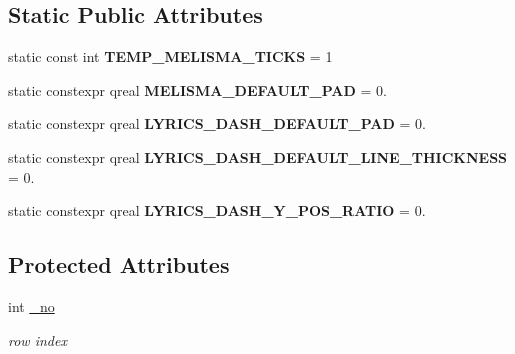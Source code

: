 \subsection*{Static Public Attributes}
\begin{DoxyCompactItemize}
\item 
\mbox{\label{class_ms_1_1_lyrics_a4686fb037dfd8ab5e6dfcf9dc6902965}} 
static const int {\bfseries T\+E\+M\+P\+\_\+\+M\+E\+L\+I\+S\+M\+A\+\_\+\+T\+I\+C\+KS} = 1
\item 
\mbox{\label{class_ms_1_1_lyrics_a29c12cf031ba4bdc50051e2d1e749e4a}} 
static constexpr qreal {\bfseries M\+E\+L\+I\+S\+M\+A\+\_\+\+D\+E\+F\+A\+U\+L\+T\+\_\+\+P\+AD} = 0.
\item 
\mbox{\label{class_ms_1_1_lyrics_a43d39f9157e3ca559b94ad166d7795d1}} 
static constexpr qreal {\bfseries L\+Y\+R\+I\+C\+S\+\_\+\+D\+A\+S\+H\+\_\+\+D\+E\+F\+A\+U\+L\+T\+\_\+\+P\+AD} = 0.
\item 
\mbox{\label{class_ms_1_1_lyrics_a31f0fbd72454ebadb6404fb7194a0380}} 
static constexpr qreal {\bfseries L\+Y\+R\+I\+C\+S\+\_\+\+D\+A\+S\+H\+\_\+\+D\+E\+F\+A\+U\+L\+T\+\_\+\+L\+I\+N\+E\+\_\+\+T\+H\+I\+C\+K\+N\+E\+SS} = 0.
\item 
\mbox{\label{class_ms_1_1_lyrics_a88b203c6638cc8e69ad87a8a89a4882f}} 
static constexpr qreal {\bfseries L\+Y\+R\+I\+C\+S\+\_\+\+D\+A\+S\+H\+\_\+\+Y\+\_\+\+P\+O\+S\+\_\+\+R\+A\+T\+IO} = 0.
\end{DoxyCompactItemize}
\subsection*{Protected Attributes}
\begin{DoxyCompactItemize}
\item 
\mbox{\label{class_ms_1_1_lyrics_abdf4d1af972f2ed7f6a7588f879e23a5}} 
int \hyperlink{class_ms_1_1_lyrics_abdf4d1af972f2ed7f6a7588f879e23a5}{\+\_\+no}
\begin{DoxyCompactList}\small\item\em row index \end{DoxyCompactList}\end{DoxyCompactItemize}
